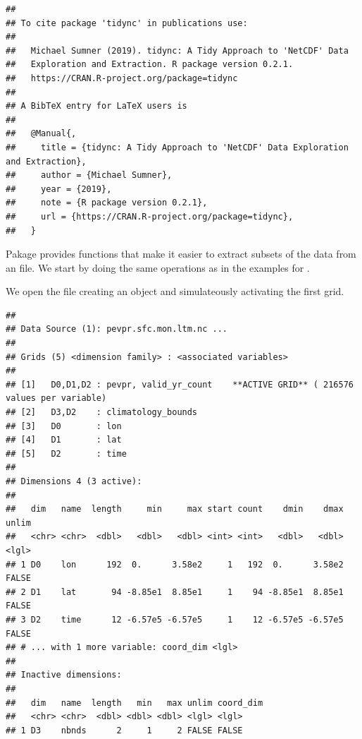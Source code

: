 \documentclass[krantz2]{krantz}\usepackage{knitr}%
\begin{document}
\begin{knitrout}\footnotesize
{}\color{fgcolor}\begin{kframe}
\begin{alltt}
\hlstd{(} \hlstd{=} \hlstd{)}
\end{alltt}
\begin{verbatim}
## 
## To cite package 'tidync' in publications use:
## 
##   Michael Sumner (2019). tidync: A Tidy Approach to 'NetCDF' Data
##   Exploration and Extraction. R package version 0.2.1.
##   https://CRAN.R-project.org/package=tidync
## 
## A BibTeX entry for LaTeX users is
## 
##   @Manual{,
##     title = {tidync: A Tidy Approach to 'NetCDF' Data Exploration and Extraction},
##     author = {Michael Sumner},
##     year = {2019},
##     note = {R package version 0.2.1},
##     url = {https://CRAN.R-project.org/package=tidync},
##   }
\end{verbatim}
\end{kframe}
\end{knitrout}

Pakage  provides functions that make it easier to extract subsets of the data from an  file. We start by doing the same operations as in the examples for .

We open the file creating an object and simulateously activating the first grid.

\begin{knitrout}\footnotesize
{}\color{fgcolor}\begin{kframe}
\begin{alltt}
 \hlkwb{<-} \hlstd{(}\hlstd{)}
\end{alltt}
\begin{verbatim}
## 
## Data Source (1): pevpr.sfc.mon.ltm.nc ...
## 
## Grids (5) <dimension family> : <associated variables> 
## 
## [1]   D0,D1,D2 : pevpr, valid_yr_count    **ACTIVE GRID** ( 216576  values per variable)
## [2]   D3,D2    : climatology_bounds
## [3]   D0       : lon
## [4]   D1       : lat
## [5]   D2       : time
## 
## Dimensions 4 (3 active): 
##   
##   dim   name  length     min     max start count    dmin    dmax unlim 
##   <chr> <chr>  <dbl>   <dbl>   <dbl> <int> <int>   <dbl>   <dbl> <lgl> 
## 1 D0    lon      192  0.      3.58e2     1   192  0.      3.58e2 FALSE 
## 2 D1    lat       94 -8.85e1  8.85e1     1    94 -8.85e1  8.85e1 FALSE 
## 3 D2    time      12 -6.57e5 -6.57e5     1    12 -6.57e5 -6.57e5 FALSE 
## # ... with 1 more variable: coord_dim <lgl> 
##   
## Inactive dimensions:
##   
##   dim   name  length   min   max unlim coord_dim 
##   <chr> <chr>  <dbl> <dbl> <dbl> <lgl> <lgl>     
## 1 D3    nbnds      2     1     2 FALSE FALSE
\end{verbatim}
\end{kframe}
\end{knitrout}
\end{document}
